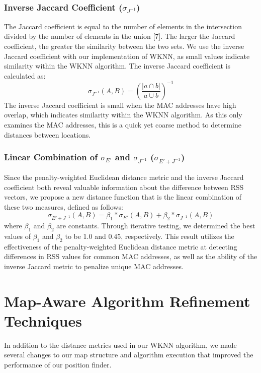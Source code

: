 \documentclass[conference]{IEEEtran}
\begin{document}
\subsubsection{Inverse Jaccard Coefficient ($\sigma_{J^{-1}}$)}
\indent The Jaccard coefficient is equal to the number of elements in the intersection divided by the number of elements in the union [7]. The larger the Jaccard coefficient, the greater the similarity between the two sets. We use the inverse Jaccard coefficient with our implementation of WKNN, as small values indicate similarity within the WKNN algorithm. The inverse Jaccard coefficient is calculated as:  
\begin{equation}
\label{jaccard}
\sigma_{J^{-1}}(A, B) = (\frac{|a\cap b|}{a\cup b})^{-1}
\end{equation}
The inverse Jaccard coefficient is small when the MAC addresses have high overlap, which indicates similarity within the WKNN algorithm. As this only examines the MAC addresses, this is a quick yet coarse method to determine distances between locations.

\subsubsection{Linear Combination of $\sigma_{E'}$ and $\sigma_{J^{-1}}$ ($\sigma_{E' + J^{-1}}$)}
\indent Since the penalty-weighted Euclidean distance metric and the inverse Jaccard coefficient both reveal valuable information about the difference between RSS vectors, we propose a new distance function that is the linear combination of these two measures, defined as follows:
\begin{equation}
\label{combined}
\sigma_{E'+J^{-1}}(A, B) = \beta_1*\sigma_{E'}(A, B)+\beta_2*\sigma_{J^{-1}}(A, B)
\end{equation}
\indent where $\beta_1$ and $\beta_2$ are constants. Through iterative testing, we determined the best values of $\beta_1$ and $\beta_2$ to be 1.0 and 0.45, respectively. This result utilizes the effectiveness of the penalty-weighted Euclidean distance metric at detecting differences in RSS values for common MAC addresses, as well as the ability of the inverse Jaccard metric to penalize unique MAC addresses.

\section{Map-Aware Algorithm Refinement Techniques}

In addition to the distance metrics used in our WKNN algorithm, we made several changes to our map structure and algorithm execution that improved the performance of our position finder. 
\end{document}
